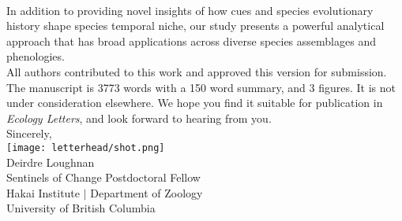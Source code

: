 \documentclass[11pt,a4paper]{article}
\begin{document}
\vspace{1.5ex}\\
In addition to providing novel insights of how cues and species evolutionary history shape species temporal niche, our study presents a powerful analytical approach that has broad applications across diverse species assemblages and phenologies.
\vspace{1.5ex}\\
\noindent All authors contributed to this work and approved this version for submission. The manuscript is 3773 words with a 150 word summary, and 3 figures. It is not under consideration elsewhere. We hope you find it suitable for publication in \emph{Ecology Letters}, and look forward to hearing from you. 
\vspace{1.5ex}\\
\noindent Sincerely, \\
\texttt{[image: letterhead/shot.png]} \\ 
\noindent Deirdre Loughnan\\
\noindent Sentinels of Change Postdoctoral Fellow\\
\noindent Hakai Institute $|$ Department of Zoology\\
\noindent University of British Columbia
\newpage
\vspace{-5ex}
% 


\newpage
\end{document}
